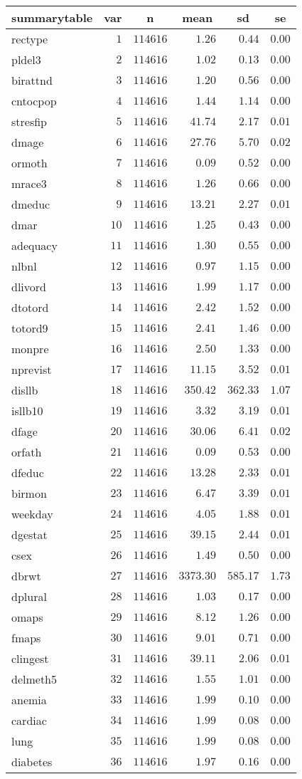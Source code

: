 %
\begin{table}[!tbp]
\begin{center}
\begin{tabular}{lrrrrr}
\hline\hline
\multicolumn{1}{l}{summarytable}&\multicolumn{1}{c}{var}&\multicolumn{1}{c}{n}&\multicolumn{1}{c}{mean}&\multicolumn{1}{c}{sd}&\multicolumn{1}{c}{se}\tabularnewline
\hline
rectype&$ 1$&$114616$&$   1.26$&$  0.44$&$0.00$\tabularnewline
pldel3&$ 2$&$114616$&$   1.02$&$  0.13$&$0.00$\tabularnewline
birattnd&$ 3$&$114616$&$   1.20$&$  0.56$&$0.00$\tabularnewline
cntocpop&$ 4$&$114616$&$   1.44$&$  1.14$&$0.00$\tabularnewline
stresfip&$ 5$&$114616$&$  41.74$&$  2.17$&$0.01$\tabularnewline
dmage&$ 6$&$114616$&$  27.76$&$  5.70$&$0.02$\tabularnewline
ormoth&$ 7$&$114616$&$   0.09$&$  0.52$&$0.00$\tabularnewline
mrace3&$ 8$&$114616$&$   1.26$&$  0.66$&$0.00$\tabularnewline
dmeduc&$ 9$&$114616$&$  13.21$&$  2.27$&$0.01$\tabularnewline
dmar&$10$&$114616$&$   1.25$&$  0.43$&$0.00$\tabularnewline
adequacy&$11$&$114616$&$   1.30$&$  0.55$&$0.00$\tabularnewline
nlbnl&$12$&$114616$&$   0.97$&$  1.15$&$0.00$\tabularnewline
dlivord&$13$&$114616$&$   1.99$&$  1.17$&$0.00$\tabularnewline
dtotord&$14$&$114616$&$   2.42$&$  1.52$&$0.00$\tabularnewline
totord9&$15$&$114616$&$   2.41$&$  1.46$&$0.00$\tabularnewline
monpre&$16$&$114616$&$   2.50$&$  1.33$&$0.00$\tabularnewline
nprevist&$17$&$114616$&$  11.15$&$  3.52$&$0.01$\tabularnewline
disllb&$18$&$114616$&$ 350.42$&$362.33$&$1.07$\tabularnewline
isllb10&$19$&$114616$&$   3.32$&$  3.19$&$0.01$\tabularnewline
dfage&$20$&$114616$&$  30.06$&$  6.41$&$0.02$\tabularnewline
orfath&$21$&$114616$&$   0.09$&$  0.53$&$0.00$\tabularnewline
dfeduc&$22$&$114616$&$  13.28$&$  2.33$&$0.01$\tabularnewline
birmon&$23$&$114616$&$   6.47$&$  3.39$&$0.01$\tabularnewline
weekday&$24$&$114616$&$   4.05$&$  1.88$&$0.01$\tabularnewline
dgestat&$25$&$114616$&$  39.15$&$  2.44$&$0.01$\tabularnewline
csex&$26$&$114616$&$   1.49$&$  0.50$&$0.00$\tabularnewline
dbrwt&$27$&$114616$&$3373.30$&$585.17$&$1.73$\tabularnewline
dplural&$28$&$114616$&$   1.03$&$  0.17$&$0.00$\tabularnewline
omaps&$29$&$114616$&$   8.12$&$  1.26$&$0.00$\tabularnewline
fmaps&$30$&$114616$&$   9.01$&$  0.71$&$0.00$\tabularnewline
clingest&$31$&$114616$&$  39.11$&$  2.06$&$0.01$\tabularnewline
delmeth5&$32$&$114616$&$   1.55$&$  1.01$&$0.00$\tabularnewline
anemia&$33$&$114616$&$   1.99$&$  0.10$&$0.00$\tabularnewline
cardiac&$34$&$114616$&$   1.99$&$  0.08$&$0.00$\tabularnewline
lung&$35$&$114616$&$   1.99$&$  0.08$&$0.00$\tabularnewline
diabetes&$36$&$114616$&$   1.97$&$  0.16$&$0.00$\tabularnewline

\end{tabular}
\end{center}
\end{table}
